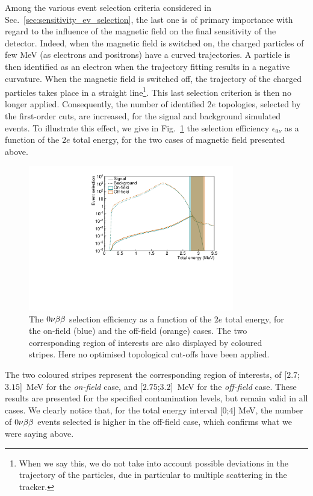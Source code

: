 Among the various event selection criteria considered in Sec.~\ref{sec:sensitivity_ev_selection}, the last one is of primary importance with regard to the influence of the magnetic field on the final sensitivity of the detector.
Indeed, when the magnetic field is switched on, the charged particles of few MeV (as electrons and positrons) have a curved trajectories.
A particle is then identified as an electron when the trajectory fitting results in a negative curvature.
When the magnetic field is switched off, the trajectory of the charged particles takes place in a straight line\footnote{When we say this, we do not take into account possible deviations in the trajectory of the particles, due in particular to multiple scattering in the tracker.}.
This last selection criterion is then no longer applied.
Consequently, the number of identified $2e$ topologies, selected by the first-order cuts, are increased, for the signal and background simulated events.
To illustrate this effect, we give in Fig.~\ref{fig:eff_0nu_w_wo_B} the selection efficiency $\epsilon_{0\nu}$ as a function of the $2e$ total energy, for the two cases of magnetic field presented above.
\begin{figure}[h]
  \centering
  \includegraphics[width=0.8\textwidth]{Sensitivity/fig_sensitivity/Nbkg_field.pdf}
  \caption{The $0\nu\beta\beta$ selection efficiency as a function of the $2e$ total energy, for the on-field (blue) and the off-field (orange) cases.
    The two corresponding region of interests are also displayed by coloured stripes.
    Here no optimised topological cut-offs have been applied.
    \label{fig:eff_0nu_w_wo_B}}
\end{figure}
The two coloured stripes represent the corresponding region of interests, of [$2.7$;$3.15$]~MeV for the \emph{on-field} case, and [$2.75$;$3.2$]~MeV for the \emph{off-field} case.
These results are presented for the specified contamination levels, but remain valid in all cases.
We clearly notice that, for the total energy interval [$0$;$4$] MeV, the number of $0\nu\beta\beta$ events selected is higher in the off-field case, which confirms what we were saying above.

